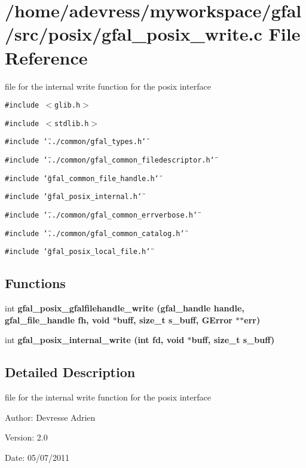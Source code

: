 \section{/home/adevress/myworkspace/gfal/src/posix/gfal\_\-posix\_\-write.c File Reference}
\label{gfal__posix__write_8c}
file for the internal write function for the posix interface 

{\tt \#include $<$glib.h$>$}\par
{\tt \#include $<$stdlib.h$>$}\par
{\tt \#include \char`\"{}../common/gfal\_\-types.h\char`\"{}}\par
{\tt \#include \char`\"{}../common/gfal\_\-common\_\-filedescriptor.h\char`\"{}}\par
{\tt \#include \char`\"{}gfal\_\-common\_\-file\_\-handle.h\char`\"{}}\par
{\tt \#include \char`\"{}gfal\_\-posix\_\-internal.h\char`\"{}}\par
{\tt \#include \char`\"{}../common/gfal\_\-common\_\-errverbose.h\char`\"{}}\par
{\tt \#include \char`\"{}../common/gfal\_\-common\_\-catalog.h\char`\"{}}\par
{\tt \#include \char`\"{}gfal\_\-posix\_\-local\_\-file.h\char`\"{}}\par
\subsection*{Functions}
\begin{CompactItemize}
\item 
int \bf{gfal\_\-posix\_\-gfalfilehandle\_\-write} (gfal\_\-handle handle, gfal\_\-file\_\-handle fh, void $\ast$buff, size\_\-t s\_\-buff, GError $\ast$$\ast$err)
\item 
int \bf{gfal\_\-posix\_\-internal\_\-write} (int fd, void $\ast$buff, size\_\-t s\_\-buff)
\end{CompactItemize}


\subsection{Detailed Description}
file for the internal write function for the posix interface 

\begin{Desc}
\item[Author:]Devresse Adrien \end{Desc}
\begin{Desc}
\item[Version:]2.0 \end{Desc}
\begin{Desc}
\item[Date:]05/07/2011 \end{Desc}


